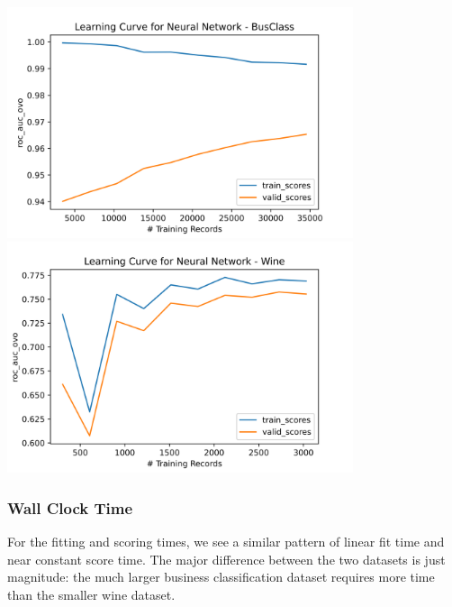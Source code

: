 \documentclass[
	letterpaper, %
]{jdf}
\begin{document}
\includegraphics[width=4in]{Figures/BusClass-0920/NN/learn_curve.png}
\includegraphics[width=4in]{Figures/Wine-0921/NN/learn_curve.png}

\subsubsection{Wall Clock Time}
For the fitting and scoring times, we see a similar pattern of linear fit time and near constant score time. The major difference between the two datasets is just magnitude: the much larger business classification dataset requires more time than the smaller wine dataset.
\end{document}

